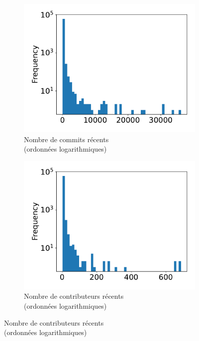 \begin{figure}[ht]
    \begin{subfigure}[t]{0.3\textwidth}
        \includegraphics[width=\textwidth]{../experiment/data_analysis/recentCommitCount_distribution}
        \caption{Nombre de \glspl{commit} récents\\(ordonnées logarithmiques)}
    \end{subfigure}
    \begin{subfigure}[t]{0.3\textwidth}
        \includegraphics[width=\textwidth]{../experiment/data_analysis/recentContributorCount_distribution}
        \caption{Nombre de contributeurs récents\\(ordonnées logarithmiques)}
    \end{subfigure}%

\end{figure}
